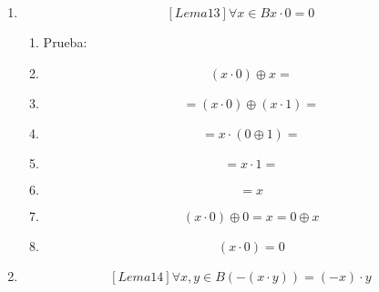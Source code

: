 \begin{enumerate}
\begin{enumerate}
\begin{enumerate}
\begin{enumerate}
        \begin{enumerate}
        \def\labelenumv{\arabic{enumv}.}
        \tightlist
        \item
          Prueba:
        \item
          \[x \oplus {\left( {0 \cdot x} \right) =}\]
        \item
          \[{= \left( {1 \cdot x} \right)} \oplus {\left( {0 \cdot x} \right) =}\]
        \item
          \[{= {\left( {1 \oplus 0} \right) \cdot x}} =\]
        \item
          \[{= {1 \cdot x}} =\]
        \item
          \[= x\]
        \item
          \[x \oplus {{\left( {0 \cdot x} \right) = x} = x} \oplus 0\]
        \item
          \[\left( {0 \cdot x} \right) = 0\]
        \end{enumerate}
      \item
        \[\left\lbrack {{Lema}13} \right\rbrack\forall{x \in B}{{x \cdot 0} = 0}\]

        \begin{enumerate}
        \def\labelenumv{\arabic{enumv}.}
        \tightlist
        \item
          Prueba:
        \item
          \[\left( {x \cdot 0} \right) \oplus {x =}\]
        \item
          \[{= \left( {x \cdot 0} \right)} \oplus {\left( {x \cdot 1} \right) =}\]
        \item
          \[{= {x \cdot \left( {0 \oplus 1} \right)}} =\]
        \item
          \[{= {x \cdot 1}} =\]
        \item
          \[= x\]
        \item
          \[\left( {x \cdot 0} \right) \oplus {{0 = x} = 0} \oplus x\]
        \item
          \[\left( {x \cdot 0} \right) = 0\]
        \end{enumerate}
      \item
        \[\left\lbrack {{Lema}14} \right\rbrack\forall x,{y \in B}{\left( {- \left( {x \cdot y} \right)} \right) = {\left( {- x} \right) \cdot y}}\]


\end{enumerate}
\end{enumerate}
\end{enumerate}
\end{enumerate}
